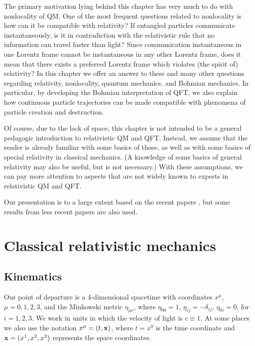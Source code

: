 \documentclass[12pt,twoside]{report} %
\begin{document}
The primary motivation lying behind this chapter has very much to do with
nonlocality of QM. One of the most frequent questions related to nonlocality
is how can it be compatible with relativity? If entangled particles communicate
instantaneously, is it in contradiction with the relativistic rule that no information 
can travel faster than light?  Since communication instantaneous in
one Lorentz frame cannot be instantaneous in any other Lorentz frame, 
does it mean that there exists a preferred Lorentz frame which violates 
(the spirit of) relativity?
In this chapter we offer an answer to these and many other questions
regarding relativity, nonlocality, quantum mechanics, and Bohmian mechanics.
In particular, by developing the Bohmian interpretation of QFT,
we also explain how continuous particle trajectories can be made
compatible with phenomena of particle creation and destruction.

Of course, due to the lack of space, this chapter is not intended to be 
a general pedagogic introduction to relativistic QM and QFT. Instead, we assume
that the reader is already familiar with some basics of those, as well as 
with some basics of special relativity in classical mechanics. (A knowledge of some
basics of general relativity may also be useful, but is not necessary.)
With these assumptions, we can pay more attention to aspects that are
not widely known to experts in relativistic QM and QFT.

Our presentation is to a large extent based on the recent papers \cite{nikijqi,nikqft,niktorino,nikscalpot},
but some results from less recent papers \cite{nik1,nik2,nik3,nik4} are also used.

\section{Classical relativistic mechanics}\label{nikolic:sec_rel}

\subsection{Kinematics}

Our point of departure is a 4-dimensional spacetime with coordinates $x^{\mu}$,
$\mu=0,1,2,3$, and the Minkowski metric
$\eta_{\mu\nu}$, where $\eta_{00}=1$, $\eta_{ij}=-\delta_{ij}$, $\eta_{0i}=0$,
for $i=1,2,3$. We work in units in which the velocity of light is $c\equiv 1$.
At some places we also use the notation $x^{\mu}=(t,{\bf x})$, where
$t=x^0$ is the time coordinate and ${\bf x}=(x^1,x^2,x^3)$ represents the
space coordinates.
\end{document}
